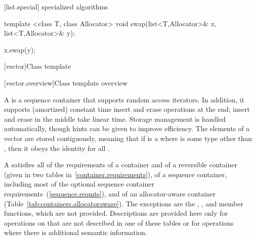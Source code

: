 [list.special]{ specialized algorithms}

%
%
\begin{itemdecl}
template <class T, class Allocator>
  void swap(list<T,Allocator>& x, list<T,Allocator>& y);
\end{itemdecl}

\begin{itemdescr}
\pnum
\effects
\begin{codeblock}
x.swap(y);
\end{codeblock}
\end{itemdescr}

[vector]{Class template }

[vector.overview]{Class template  overview}

\pnum
{}%
A
is a sequence container that supports random access iterators.
In addition, it supports (amortized) constant time insert and erase operations at the end;
insert and erase in the middle take linear time.
Storage management is handled automatically, though hints can be given
to improve efficiency.
The elements of a vector are stored contiguously, meaning that if
is a
where
is some type other than
,
then it obeys the identity
for all
.

\pnum
A  satisfies all of the requirements of a container and of a
reversible container (given in two tables in~\ref{container.requirements}), of a
sequence container, including most of the optional sequence container
requirements~(\ref{sequence.reqmts}), and of an allocator-aware container
(Table~\ref{tab:containers.allocatoraware}). The exceptions are the
, , and  member functions, which are not
provided. Descriptions are provided here only for operations on 
that are not described in one of these tables or for operations where there is
additional semantic information.

